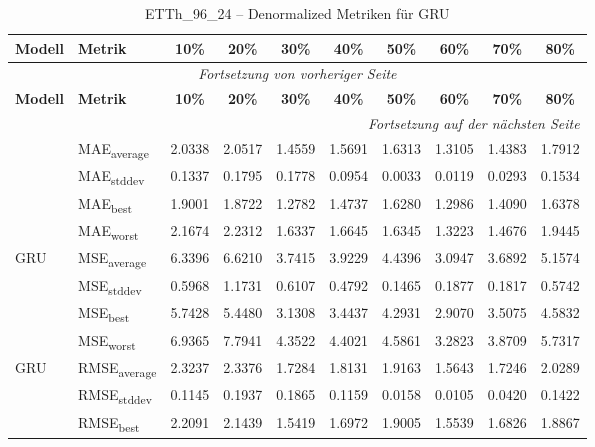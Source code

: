 {\small
\begin{longtable}{l l c c c c c c c c}
    \toprule
    \textbf{Modell} & \textbf{Metrik} & \textbf{10\%} & \textbf{20\%} & \textbf{30\%} & \textbf{40\%} & \textbf{50\%} & \textbf{60\%} & \textbf{70\%} & \textbf{80\%} \\
    \midrule
    \endfirsthead
    \multicolumn{10}{c}{\textit{Fortsetzung von vorheriger Seite}} \\
    \toprule
    \textbf{Modell} & \textbf{Metrik} & \textbf{10\%} & \textbf{20\%} & \textbf{30\%} & \textbf{40\%} & \textbf{50\%} & \textbf{60\%} & \textbf{70\%} & \textbf{80\%} \\
    \midrule
    \endhead
    \midrule
    \multicolumn{10}{r}{\textit{Fortsetzung auf der nächsten Seite}} \\
    \midrule
    \endfoot
    \bottomrule
    \caption{ETTh_96_24 -- Denormalized Metriken für GRU}
    \label{tab:etth_96_24_denormalized_gru}
    \endlastfoot
\multirow{4}{*}{GRU} & MAE\textsubscript{average} & 2.0338 & 2.0517 & 1.4559 & 1.5691 & 1.6313 & 1.3105 & 1.4383 & 1.7912 \\
 & MAE\textsubscript{stddev} & 0.1337 & 0.1795 & 0.1778 & 0.0954 & 0.0033 & 0.0119 & 0.0293 & 0.1534 \\
 & MAE\textsubscript{best} & 1.9001 & 1.8722 & 1.2782 & 1.4737 & 1.6280 & 1.2986 & 1.4090 & 1.6378 \\
 & MAE\textsubscript{worst} & 2.1674 & 2.2312 & 1.6337 & 1.6645 & 1.6345 & 1.3223 & 1.4676 & 1.9445 \\
\cmidrule(lr){2-10}
\multirow{4}{*}{GRU} & MSE\textsubscript{average} & 6.3396 & 6.6210 & 3.7415 & 3.9229 & 4.4396 & 3.0947 & 3.6892 & 5.1574 \\
 & MSE\textsubscript{stddev} & 0.5968 & 1.1731 & 0.6107 & 0.4792 & 0.1465 & 0.1877 & 0.1817 & 0.5742 \\
 & MSE\textsubscript{best} & 5.7428 & 5.4480 & 3.1308 & 3.4437 & 4.2931 & 2.9070 & 3.5075 & 4.5832 \\
 & MSE\textsubscript{worst} & 6.9365 & 7.7941 & 4.3522 & 4.4021 & 4.5861 & 3.2823 & 3.8709 & 5.7317 \\
\cmidrule(lr){2-10}
\multirow{4}{*}{GRU} & RMSE\textsubscript{average} & 2.3237 & 2.3376 & 1.7284 & 1.8131 & 1.9163 & 1.5643 & 1.7246 & 2.0289 \\
 & RMSE\textsubscript{stddev} & 0.1145 & 0.1937 & 0.1865 & 0.1159 & 0.0158 & 0.0105 & 0.0420 & 0.1422 \\
 & RMSE\textsubscript{best} & 2.2091 & 2.1439 & 1.5419 & 1.6972 & 1.9005 & 1.5539 & 1.6826 & 1.8867 \\

\end{longtable}}
